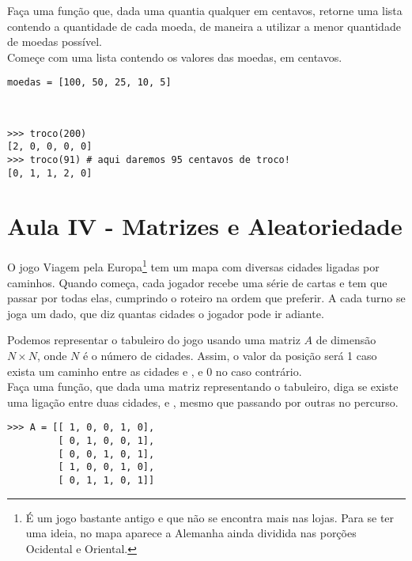 \documentclass[12pt]{article}
\begin{document}
	\quest Faça uma função que, dada uma quantia qualquer em centavos, retorne uma lista contendo a quantidade de cada moeda, de maneira a utilizar a menor quantidade de moedas possível.\\
	
	\clue Começe com uma lista contendo os valores das moedas, em centavos.\\
	
	\begin{lstlisting}
moedas = [100, 50, 25, 10, 5]
	\end{lstlisting}	
	~\\
	\example
	\begin{lstlisting}
>>> troco(200)
[2, 0, 0, 0, 0]
>>> troco(91) # aqui daremos 95 centavos de troco!
[0, 1, 1, 2, 0]
	\end{lstlisting}
	\pagebreak
	
	\section{Aula IV - Matrizes e Aleatoriedade}
	
	
	O jogo Viagem pela Europa\footnote{É um jogo bastante antigo e que não se encontra mais nas lojas. Para se ter uma ideia, no mapa aparece a Alemanha ainda dividida nas porções Ocidental e Oriental.} tem um mapa com diversas cidades ligadas por caminhos. Quando começa, cada jogador recebe uma série de cartas e tem que passar por todas elas, cumprindo o roteiro na ordem que preferir. A cada turno se joga um dado, que diz quantas cidades o jogador pode ir adiante.
	
	
	Podemos representar o tabuleiro do jogo usando uma matriz $A$ de dimensão $N \times N$, onde $N$ é o número de cidades. Assim, o valor da posição  será 1 caso exista um caminho entre as cidades  e , e 0 no caso contrário.\\
	
	\quest Faça uma função, que dada uma matriz  representando o tabuleiro, diga se existe uma ligação entre duas cidades,  e , mesmo que passando por outras no percurso.\\

	\example
	\begin{lstlisting}
>>> A = [[ 1, 0, 0, 1, 0],
		 [ 0, 1, 0, 0, 1],
		 [ 0, 0, 1, 0, 1],
		 [ 1, 0, 0, 1, 0],
		 [ 0, 1, 1, 0, 1]]
	\end{lstlisting}
	
\end{document}
